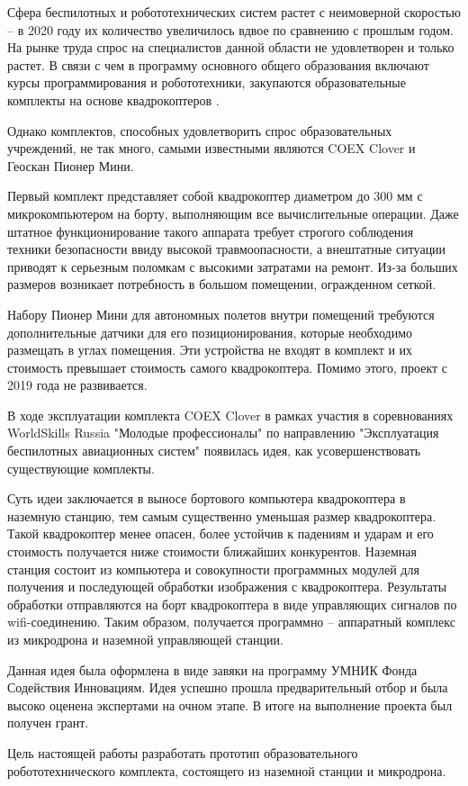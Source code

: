 Сфера беспилотных и робототехнических систем растет с неимоверной скоростью -- в 2020 году их количество увеличилось вдвое по сравнению с прошлым годом. На рынке труда спрос на специалистов данной области не удовлетворен и только растет. В связи с чем в программу основного общего образования включают курсы программирования и робототехники, закупаются образовательные комплекты на основе квадрокоптеров \cite{minobr}.

Однако комплектов, способных удовлетворить спрос образовательных учреждений, не так много, самыми известными являются COEX Clover и Геоскан Пионер Мини.

Первый комплект представляет собой квадрокоптер диаметром до 300 мм с микрокомпьютером на борту, выполняющим все вычислительные операции. Даже штатное функционирование такого аппарата требует строгого соблюдения техники безопасности ввиду высокой травмоопасности, а внештатные ситуации приводят к серьезным поломкам с высокими затратами на ремонт. Из-за больших размеров возникает потребность в большом помещении, огражденном сеткой.

Набору Пионер Мини для автономных полетов внутри помещений требуются дополнительные датчики для его позиционирования, которые необходимо размещать в углах помещения. Эти устройства не входят в комплект и их стоимость превышает стоимость самого квадрокоптера. Помимо этого, проект с 2019 года не развивается.

В ходе эксплуатации комплекта COEX Clover в рамках участия в соревнованиях WorldSkills Russia "Молодые профессионалы" по направлению "Эксплуатация беспилотных авиационных систем" появилась идея, как усовершенствовать существующие комплекты.

Суть идеи заключается в выносе бортового компьютера квадрокоптера в наземную станцию, тем самым существенно уменьшая размер квадрокоптера. Такой квадрокоптер менее опасен, более устойчив к падениям и ударам и его стоимость получается ниже стоимости ближайших конкурентов. Наземная станция состоит из компьютера и совокупности программных модулей для получения и последующей обработки изображения с квадрокоптера. Результаты обработки отправляются на борт квадрокоптера в виде управляющих сигналов по wifi-соединению. Таким образом, получается программно -- аппаратный комплекс из микродрона и наземной управляющей станции.

Данная идея была оформлена в виде завяки на программу УМНИК Фонда Содействия Инновациям. Идея успешно прошла предварительный отбор \cite{umnik} и была высоко оценена экспертами на очном этапе. В итоге на выполнение проекта был получен грант.

Цель настоящей работы разработать прототип образовательного робототехнического комплекта, состоящего из наземной станции и микродрона.
